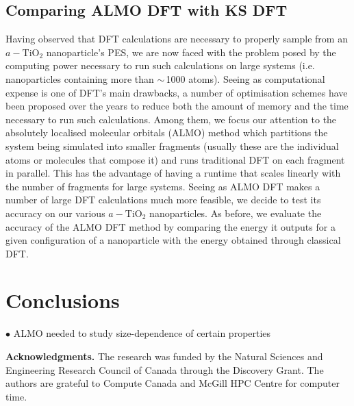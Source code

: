 \documentclass[aps,prb,twocolumn,amsmath,amssymb,superscriptaddress,longbibliography]{revtex4-1}
\newcommand\tab[1][1cm]{\hspace*{#1}} %
\begin{document}
\subsection{Comparing ALMO DFT with KS DFT}

\tab Having observed that DFT calculations are necessary to properly sample from an $a-\text{TiO}_2$ nanoparticle's PES, we are now faced with the problem posed by the computing power necessary to run such calculations on large systems (i.e. nanoparticles containing more than $\sim\,$1000 atoms).
Seeing as computational expense is one of DFT's main drawbacks, a number of optimisation schemes have been proposed over the years to reduce both the amount of memory and the time necessary to run such calculations.
Among them, we focus our attention to the absolutely localised molecular orbitals (ALMO) method which partitions the system being simulated into smaller fragments (usually these are the individual atoms or molecules that compose it) and runs traditional DFT on each fragment in parallel.
This has the advantage of having a runtime that scales linearly with the number of fragments for large systems.
Seeing as ALMO DFT makes a number of large DFT calculations much more feasible, we decide to test its accuracy on our various $a-\text{TiO}_2$ nanoparticles.
As before, we evaluate the accuracy of the ALMO DFT method by comparing the energy it outputs for a given configuration of a nanoparticle with the energy obtained through classical DFT.  

\section*{Conclusions} 

$\bullet$ ALMO needed to study size-dependence of certain properties



\textbf{Acknowledgments.} The research was funded by the Natural Sciences and Engineering Research Council of Canada through the Discovery Grant. The authors are grateful to Compute Canada and McGill HPC Centre for computer time.



\end{document}
